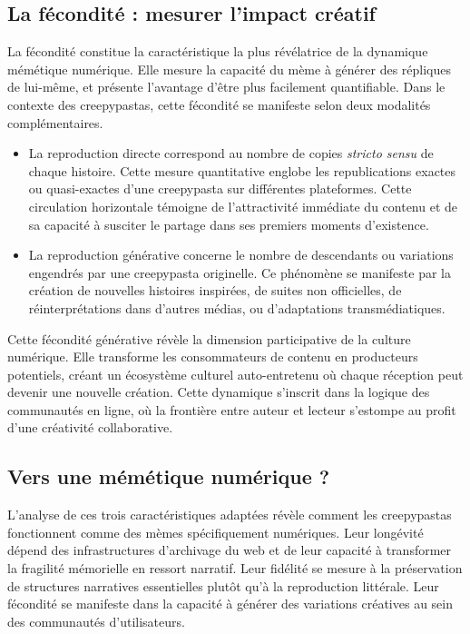 \documentclass[12pt,a4paper,oneside,titlepage]{book} %
\begin{document}
\subsection{La fécondité : mesurer l'impact créatif}

La fécondité constitue la caractéristique la plus révélatrice de la dynamique mémétique numérique. Elle mesure la capacité du mème à générer des répliques de lui-même, et présente l'avantage d'être plus facilement quantifiable. Dans le contexte des creepypastas, cette fécondité se manifeste selon deux modalités complémentaires.
\begin{itemize}
    \item La reproduction directe correspond au nombre de copies \textit{stricto sensu} de chaque histoire. Cette mesure quantitative englobe les republications exactes ou quasi-exactes d'une creepypasta sur différentes plateformes. Cette circulation horizontale témoigne de l'attractivité immédiate du contenu et de sa capacité à susciter le partage dans ses premiers moments d'existence.
    \item La reproduction générative concerne le nombre de \og descendants \fg{} ou variations engendrés par une creepypasta originelle. Ce phénomène se manifeste par la création de nouvelles histoires inspirées, de suites non officielles, de réinterprétations dans d'autres médias, ou d'adaptations transmédiatiques.
    
\end{itemize}

Cette fécondité générative révèle la dimension participative de la culture numérique. Elle transforme les consommateurs de contenu en producteurs potentiels, créant un écosystème culturel auto-entretenu où chaque réception peut devenir une nouvelle création. Cette dynamique s'inscrit dans la logique des communautés en ligne, où la frontière entre auteur et lecteur s'estompe au profit d'une créativité collaborative.

\subsection{Vers une mémétique numérique ? }

L'analyse de ces trois caractéristiques adaptées révèle comment les creepypastas fonctionnent comme des mèmes spécifiquement numériques. Leur longévité dépend des infrastructures d'archivage du web et de leur capacité à transformer la fragilité mémorielle en ressort narratif. Leur fidélité se mesure à la préservation de structures narratives essentielles plutôt qu'à la reproduction littérale. Leur fécondité se manifeste dans la capacité à générer des variations créatives au sein des communautés d'utilisateurs.
\end{document}
